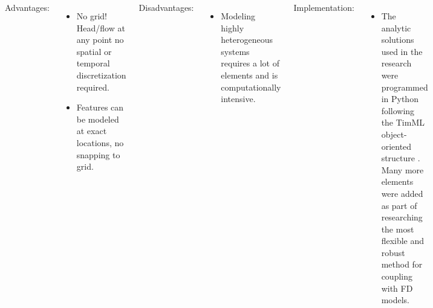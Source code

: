 \documentclass[17pt, a0paper, portrait, margin=0mm, innermargin=5mm, blockverticalspace=7mm, colspace=6.5mm, subcolspace=6.5mm]{tikzposter}
\begin{document}
\begin{columns}
{        \vspace{3mm}
        
        Advantages:
        \begin{itemize}[noitemsep]
            \item No grid! Head/flow at any point no spatial or temporal discretization required.
            \item Features can be modeled at exact locations, no snapping to grid.
        \end{itemize}
        
        \vspace{3mm}
        
        Disadvantages:
        \begin{itemize}[noitemsep]
            \item Modeling highly heterogeneous systems requires a lot of elements and is computationally intensive.
        \end{itemize}   

        \vspace{3mm}
        
        Implementation:
        \begin{itemize}[noitemsep]
            \item The analytic solutions used in the research were programmed in Python following the TimML object-oriented structure \citep{bakker_writing_2009,mark_bakker_analytical_2022}. Many more elements were added as part of researching the most flexible and robust method for coupling with FD models.
        \end{itemize}
}

\end{columns}
\end{document}
